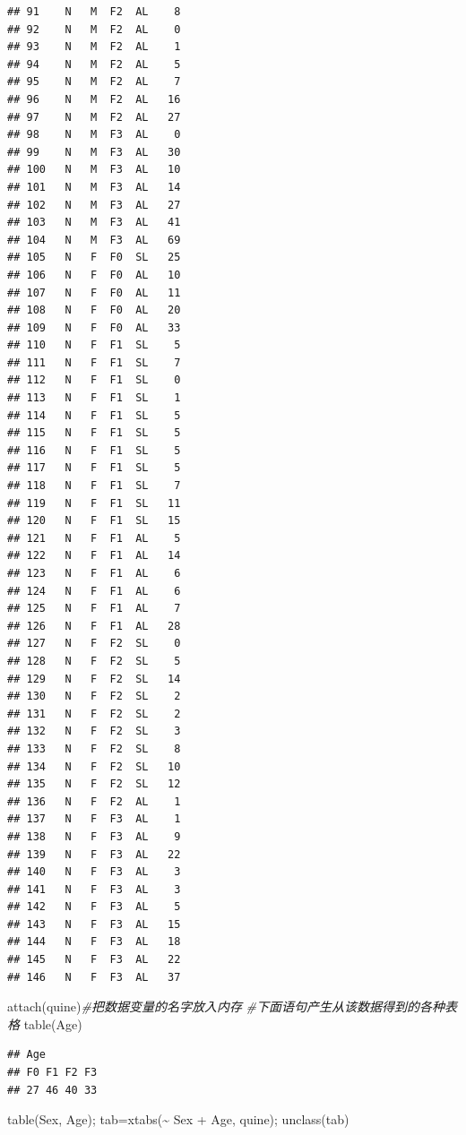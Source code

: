 \documentclass[
]{book}
\newenvironment{Shaded}{\begin{snugshade}}{\end{snugshade}}
\newcommand{\CommentTok}[1]{\textcolor[rgb]{0.56,0.35,0.01}{\textit{#1}}}
\newcommand{\FunctionTok}[1]{\textcolor[rgb]{0.00,0.00,0.00}{#1}}
\newcommand{\NormalTok}[1]{#1}
\newcommand{\OtherTok}[1]{\textcolor[rgb]{0.56,0.35,0.01}{#1}}
\newcommand{\SpecialCharTok}[1]{\textcolor[rgb]{0.00,0.00,0.00}{#1}}
\begin{document}
\begin{verbatim}
## 91    N   M  F2  AL    8
## 92    N   M  F2  AL    0
## 93    N   M  F2  AL    1
## 94    N   M  F2  AL    5
## 95    N   M  F2  AL    7
## 96    N   M  F2  AL   16
## 97    N   M  F2  AL   27
## 98    N   M  F3  AL    0
## 99    N   M  F3  AL   30
## 100   N   M  F3  AL   10
## 101   N   M  F3  AL   14
## 102   N   M  F3  AL   27
## 103   N   M  F3  AL   41
## 104   N   M  F3  AL   69
## 105   N   F  F0  SL   25
## 106   N   F  F0  AL   10
## 107   N   F  F0  AL   11
## 108   N   F  F0  AL   20
## 109   N   F  F0  AL   33
## 110   N   F  F1  SL    5
## 111   N   F  F1  SL    7
## 112   N   F  F1  SL    0
## 113   N   F  F1  SL    1
## 114   N   F  F1  SL    5
## 115   N   F  F1  SL    5
## 116   N   F  F1  SL    5
## 117   N   F  F1  SL    5
## 118   N   F  F1  SL    7
## 119   N   F  F1  SL   11
## 120   N   F  F1  SL   15
## 121   N   F  F1  AL    5
## 122   N   F  F1  AL   14
## 123   N   F  F1  AL    6
## 124   N   F  F1  AL    6
## 125   N   F  F1  AL    7
## 126   N   F  F1  AL   28
## 127   N   F  F2  SL    0
## 128   N   F  F2  SL    5
## 129   N   F  F2  SL   14
## 130   N   F  F2  SL    2
## 131   N   F  F2  SL    2
## 132   N   F  F2  SL    3
## 133   N   F  F2  SL    8
## 134   N   F  F2  SL   10
## 135   N   F  F2  SL   12
## 136   N   F  F2  AL    1
## 137   N   F  F3  AL    1
## 138   N   F  F3  AL    9
## 139   N   F  F3  AL   22
## 140   N   F  F3  AL    3
## 141   N   F  F3  AL    3
## 142   N   F  F3  AL    5
## 143   N   F  F3  AL   15
## 144   N   F  F3  AL   18
## 145   N   F  F3  AL   22
## 146   N   F  F3  AL   37
\end{verbatim}

\begin{Shaded}
\begin{Highlighting}[]
\FunctionTok{attach}\NormalTok{(quine)}\CommentTok{\#把数据变量的名字放入内存}
\CommentTok{\#下面语句产生从该数据得到的各种表格}
\FunctionTok{table}\NormalTok{(Age)}
\end{Highlighting}
\end{Shaded}

\begin{verbatim}
## Age
## F0 F1 F2 F3 
## 27 46 40 33
\end{verbatim}

\begin{Shaded}
\begin{Highlighting}[]
\FunctionTok{table}\NormalTok{(Sex, Age); tab}\OtherTok{=}\FunctionTok{xtabs}\NormalTok{(}\SpecialCharTok{\textasciitilde{}}\NormalTok{ Sex }\SpecialCharTok{+}\NormalTok{ Age, quine); }\FunctionTok{unclass}\NormalTok{(tab)}
\end{Highlighting}
\end{Shaded}
\end{document}

